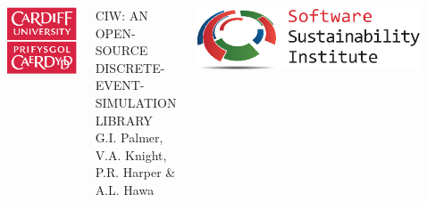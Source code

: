 \documentclass[usenames,dvipsnames,t]{beamer}
\begin{document}
\begin{columns}
  \begin{column}{0.015\linewidth}
  \end{column}
  \begin{column}{0.11\linewidth}
    \begin{center}
      \vspace{2mm}
      \includegraphics[width=\textwidth]{../cflogo}
    \end{center}
  \end{column}
  \begin{column}{0.575\linewidth}
    \begin{center}
      \vspace{3mm}
      \textcolor{textgrey}{\huge{CIW: AN OPEN-SOURCE DISCRETE-\\[5mm]EVENT-SIMULATION LIBRARY}}\\[10mm]
      \textcolor{textorange}{\LARGE{G.I. Palmer, V.A. Knight, P.R. Harper \& A.L. Hawa}}
      \vspace{5mm}
    \end{center}
  \end{column}
  \begin{column}{0.3\linewidth}
    \begin{center}
      \vspace{10mm}
      \includegraphics[width=\textwidth]{../SSI_Logo}
    \end{center}
  \end{column}
  \begin{column}{0.015\linewidth}
  \end{column}
\end{columns}
\end{document}
